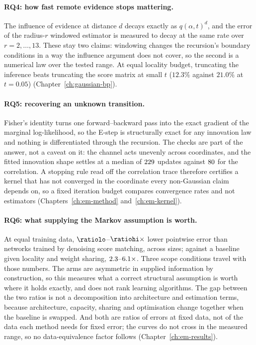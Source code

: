 \paragraph{RQ4: how fast remote evidence stops mattering.} The influence of
evidence at distance $d$ decays exactly as $q(\alpha,t)^d$, and the error of the
radius-$r$ windowed estimator is measured to decay at the same rate over
$r = 2,\dots,13$. These stay two claims: windowing changes the recursion's
boundary conditions in a way the influence argument does not cover, so the
second is a numerical law over the tested range. At equal locality budget,
truncating the inference beats truncating the score matrix at small $t$
($12.3\%$ against $21.0\%$ at $t = 0.05$) (Chapter~\ref{ch:gaussian-bp}).

\paragraph{RQ5: recovering an unknown transition.} Fisher's identity turns one
forward--backward pass into the exact gradient of the marginal log-likelihood,
so the E-step is structurally exact for any innovation law and nothing is
differentiated through the recursion. The checks are part of the answer, not a
caveat on it: the channel acts unevenly across coordinates, and the fitted
innovation shape settles at a median of $229$ updates against
$80$ for the correlation. A stopping rule read off the correlation
trace therefore certifies a kernel that has not converged in the coordinate
every non-Gaussian claim depends on, so a fixed iteration budget compares
convergence rates and not estimators
(Chapters~\ref{ch:em-method} and~\ref{ch:em-kernel}).

\paragraph{RQ6: what supplying the Markov assumption is worth.} At equal
training data, $\ratiolo$--$\ratiohi\times$ lower pointwise error than networks
trained by denoising score matching, across \nsizesused{} sizes; against a
baseline given locality and weight sharing, $2.3$--$6.1\times$.
Three scope conditions travel with those numbers. The arms are asymmetric in
supplied information by construction, so this measures what a correct structural
assumption is worth where it holds exactly, and does not rank learning
algorithms. The gap between the two ratios is not a decomposition into
architecture and estimation terms, because architecture, capacity, sharing and
optimisation change together when the baseline is swapped. And both are ratios
of errors at fixed data, not of the data each method needs for fixed error; the
curves do not cross in the measured range, so no data-equivalence factor follows
(Chapter~\ref{ch:em-results}).

